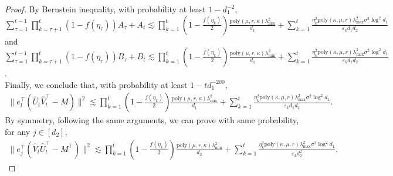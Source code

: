 \documentclass[12pt]{article}
\theoremstyle{plain}
\begin{document}
\begin{proof}
By Bernstein inequality, with probability at least $1-d_1^{-2}$, $\sum_{\tau=1}^{t-1}\prod_{k=\tau+1}^{t}(1-f(\eta_{\tau}))A_{\tau}+A_t\lesssim \prod_{k=1}^{t}(1-\frac{f(\eta_k)}{2}) \frac{\text{poly}(\mu,r,\kappa)\lambda_{\min}^2}{d_1}  +  \sum_{k=1}^{t} \frac{\eta_k^2\text{poly}(\kappa,\mu,r)\lambda_{\max}^2\sigma^2\log^2d_1}{\varepsilon_k d_1d_2}$ and $\sum_{\tau=1}^{t-1}\prod_{k=\tau+1}^{t}(1-f(\eta_{\tau}))B_{\tau}+B_t\lesssim \prod_{k=1}^{t}(1-\frac{f(\eta_k)}{2}) \frac{\text{poly}(\mu,r,\kappa)\lambda_{\min}^2}{d_1}  +  \sum_{k=1}^{t} \frac{\eta_k^2\text{poly}(\kappa,\mu,r)\lambda_{\max}^2\sigma^2\log^2d_1}{\varepsilon_k d_1d_2}$. \\
Finally, we conclude that, with probability at least $1-td_1^{-200}$,
\begin{align*}
    \|e_l^{\top}(\widehat{U}_t\widehat{V}_t^{\top}-M)\|^2\lesssim \prod_{k=1}^{t}(1-\frac{f(\eta_k)}{2}) \frac{\text{poly}(\mu,r,\kappa)\lambda_{\min}^2}{d_1} +   \sum_{k=1}^{t} \frac{\eta_k^2\text{poly}(\kappa,\mu,r)\lambda_{\max}^2\sigma^2\log^2d_1}{\varepsilon_k d_1d_2}.
\end{align*}
By symmetry, following the same arguments, we can prove with same probability, for any $j\in [d_2]$,
\begin{align*}
    \|e_j^{\top}(\widehat{V}_t\widehat{U}_t^{\top}-M^{\top})\|^2\lesssim \prod_{k=1}^{t}(1-\frac{f(\eta_k)}{2}) \frac{\text{poly}(\mu,r,\kappa)\lambda_{\min}^2}{d_2} +  \sum_{k=1}^{t} \frac{\eta_k^2\text{poly}(\kappa,\mu,r)\lambda_{\max}^2\sigma^2\log^2d_1}{\varepsilon_k d_2^2}.
\end{align*}
\end{proof}
\end{document}
